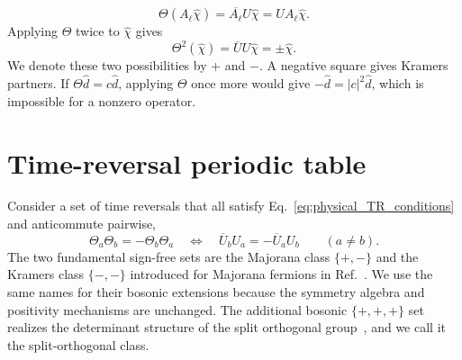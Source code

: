 \documentclass[onecolumn,aps,prb,amsmath,amssymb,superscriptaddress,longbibliography]{revtex4-2}
\begin{document}
\begin{equation}
    \Theta(A_\ell\hat\chi)
    =\overline{A_\ell}U\hat\chi
    =UA_\ell\hat\chi.
    \label{eq:TR_commutes_A}
\end{equation}
Applying \(\Theta\) twice to \(\hat\chi\) gives
\begin{equation}
    \Theta^2(\hat\chi)=\overline U U\hat\chi
    =\pm\hat\chi.
    \label{eq:TR_square}
\end{equation}
We denote these two possibilities by \(+\) and \(-\).  A negative square gives Kramers partners.  If \(\Theta\hat d=c\hat d\), applying \(\Theta\) once more would give \(-\hat d=|c|^2\hat d\), which is impossible for a nonzero operator.

\section{Time-reversal periodic table}

Consider a set of time reversals that all satisfy Eq.~\eqref{eq:physical_TR_conditions} and anticommute pairwise,
\begin{equation}
    \Theta_a\Theta_b=-\Theta_b\Theta_a
    \quad\Longleftrightarrow\quad
    \overline U_bU_a=-\overline U_aU_b
    \qquad (a\ne b).
    \label{eq:anticommuting_TR}
\end{equation}
The two fundamental sign-free sets are the Majorana class \(\{+,-\}\) and the Kramers class \(\{-,-\}\) introduced for Majorana fermions in Ref.~\cite{li2016prl}.  We use the same names for their bosonic extensions because the symmetry algebra and positivity mechanisms are unchanged.  The additional bosonic \(\{+,+,+\}\) set realizes the determinant structure of the split orthogonal group~\cite{wang2015prl}, and we call it the split-orthogonal class.
\end{document}
